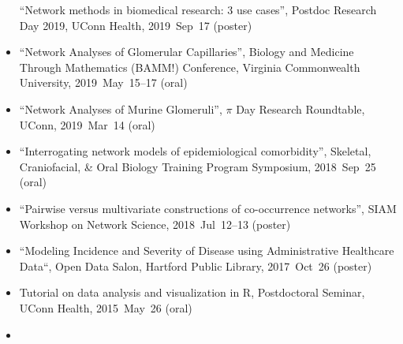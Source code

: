 \documentclass[10pt,a4paper]{article}
\begin{document}
\begin{itemize}[label=$\circ$,nolistsep]
``Network methods in biomedical research: 3 use cases'', Postdoc Research Day 2019, UConn Health, 2019~Sep~17 (poster)
\item
``Network Analyses of Glomerular Capillaries'', Biology and Medicine Through Mathematics (BAMM!) Conference, Virginia Commonwealth University, 2019~May~15--17 (oral)
\item
``Network Analyses of Murine Glomeruli'', $\pi$ Day Research Roundtable, UConn, 2019~Mar~14 (oral)
\item
``Interrogating network models of epidemiological comorbidity'', Skeletal, Craniofacial, \& Oral Biology Training Program Symposium, 2018~Sep~25 (oral)
\item
``Pairwise versus multivariate constructions of co-occurrence networks'', SIAM Workshop on Network Science, 2018~Jul~12--13 (poster)
\item
``Modeling Incidence and Severity of Disease using Administrative Healthcare Data``, Open Data Salon, Hartford Public Library, 2017~Oct~26 (poster)
\item
Tutorial on data analysis and visualization in R, Postdoctoral Seminar, UConn Health, 2015~May~26 (oral)
\item

\end{itemize}
\end{document}
